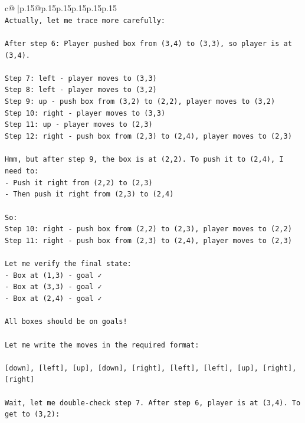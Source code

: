 \documentclass{article}
\begin{document}
{\begin{supertabular}{c@{$\;$}|p{.15\linewidth}@{}p{.15\linewidth}p{.15\linewidth}p{.15\linewidth}p{.15\linewidth}p{.15\linewidth}}
{{{\\ 
\texttt{Actually, let me trace more carefully:} \\
\\ 
\texttt{After step 6: Player pushed box from (3,4) to (3,3), so player is at (3,4).} \\
\\ 
\texttt{Step 7: left {-} player moves to (3,3)} \\
\texttt{Step 8: left {-} player moves to (3,2)} \\
\texttt{Step 9: up {-} push box from (3,2) to (2,2), player moves to (3,2)} \\
\texttt{Step 10: right {-} player moves to (3,3)} \\
\texttt{Step 11: up {-} player moves to (2,3)} \\
\texttt{Step 12: right {-} push box from (2,3) to (2,4), player moves to (2,3)} \\
\\ 
\texttt{Hmm, but after step 9, the box is at (2,2). To push it to (2,4), I need to:} \\
\texttt{{-} Push it right from (2,2) to (2,3)} \\
\texttt{{-} Then push it right from (2,3) to (2,4)} \\
\\ 
\texttt{So:} \\
\texttt{Step 10: right {-} push box from (2,2) to (2,3), player moves to (2,2)} \\
\texttt{Step 11: right {-} push box from (2,3) to (2,4), player moves to (2,3)} \\
\\ 
\texttt{Let me verify the final state:} \\
\texttt{{-} Box at (1,3) {-} goal ✓} \\
\texttt{{-} Box at (3,3) {-} goal ✓} \\
\texttt{{-} Box at (2,4) {-} goal ✓} \\
\\ 
\texttt{All boxes should be on goals!} \\
\\ 
\texttt{Let me write the moves in the required format:} \\
\\ 
\texttt{{[}down{]}, {[}left{]}, {[}up{]}, {[}down{]}, {[}right{]}, {[}left{]}, {[}left{]}, {[}up{]}, {[}right{]}, {[}right{]}} \\
\\ 
\texttt{Wait, let me double{-}check step 7. After step 6, player is at (3,4). To get to (3,2):} \\
}}}
\end{supertabular}}
\end{document}
